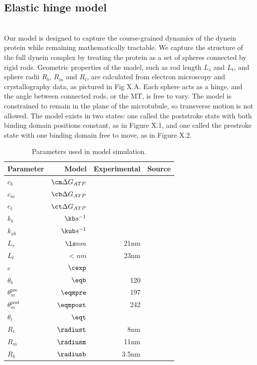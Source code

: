 \documentclass[9pt,twocolumn,twoside]{pnas-new}
\begin{document}
\subsection*{Elastic hinge model}~\\
Our model is designed to capture the course-grained dynamics of the dynein protein while remaining mathematically tractable. We capture the structure of the full dynein complex by treating the protein as a set of spheres connected by rigid rods. Geometric properties of the model, such as rod length $L_s$ and $L_t$, and sphere radii $R_b$, $R_m$ and $R_t$, are calculated from electron microscopy and crystallography data, as pictured in Fig X.A. Each sphere acts as a hinge, and the angle between connected rods, or the MT, is free to vary. The model is constrained to remain in the plane of the microtubule, so transverse motion is not allowed. The model exists in two states: one called the poststroke state with both binding domain positions constant, as in Figure X.1, and one called the prestroke state with one binding domain free to move, as in Figure X.2.

\begin{table}[tbhp]
\centering
\caption{Parameters used in model simulation.}
\label{tab:staticparams}
\begin{tabular}{lrrr}
Parameter & Model & Experimental & Source \\
\midrule
$c_b$ & $\cm \Delta G_{ATP}$ &  & \\
$c_m$ & $\cb \Delta G_{ATP}$ &  & \\
$c_t$ & $\ct \Delta G_{ATP}$ &  & \\
$k_b$ & $\kb s^{-1}$&  & \\
$k_{ub}$ & $\kub s^{-1}$ & & \\
$L_s$ & $\ls nm$ & 21nm & \cite{burgess-paper, 3vkh-cite, carter-paper}\\
$L_t$ & $\lt nm$ & 23nm & \cite{burgess-paper, 3vkh-cite, carter-paper}\\
$c$ & $\cexp$ & & \\
$\theta_b$ & $\eqb$ &  120 & \cite{leschziner} \\
$\theta_m^{\mbox{pre}}$ & $\eqmpre$ &  197 & \cite{burgess-paper}\\
$\theta_m^{\mbox{post}}$ & $\eqmpost$ & 242 & \cite{burgess-paper}\\
$\theta_t$ & $\eqt$ &  & \\
$R_t$ & $\radiust$ & 8nm & \cite{burgess-paper}\\
$R_m$ & $\radiusm$ & 11nm & \cite{burgess-paper}\\
$R_b$ & $\radiusb$ & 3.5nm & \cite{burgess-paper}\\

\bottomrule
\end{tabular}

\end{table}
\end{document}
